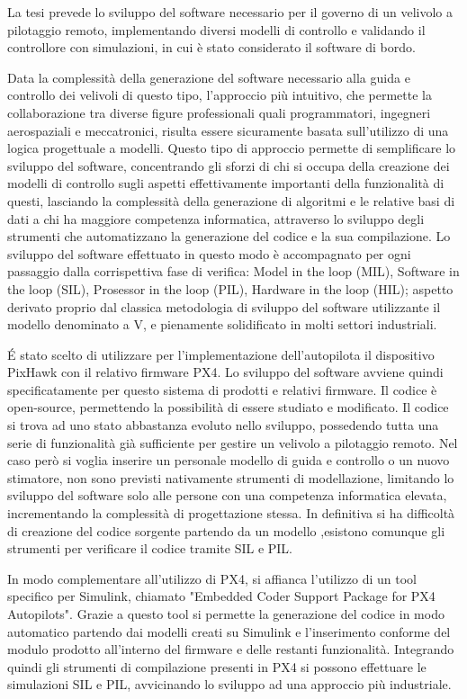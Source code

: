 \sommario
La tesi prevede lo sviluppo del software necessario per il governo di un velivolo a pilotaggio remoto, implementando diversi modelli di controllo e validando il controllore con simulazioni, in cui è stato considerato il software di bordo.

Data la complessità della generazione del software necessario alla guida e controllo dei velivoli di questo tipo, l'approccio più intuitivo, che permette la collaborazione tra diverse figure professionali quali programmatori, ingegneri aerospaziali e meccatronici, risulta essere sicuramente basata sull'utilizzo di una logica progettuale a modelli. Questo tipo di approccio permette di semplificare lo sviluppo del software, concentrando gli sforzi di chi si occupa della creazione dei modelli di controllo sugli aspetti effettivamente importanti della funzionalità di questi, lasciando la complessità della generazione di algoritmi e le relative basi di dati a chi ha maggiore competenza informatica, attraverso lo sviluppo degli strumenti che automatizzano la generazione del codice e la sua compilazione. 
Lo sviluppo del software effettuato in questo modo è accompagnato per ogni passaggio dalla corrispettiva fase di verifica: Model in the loop (MIL), Software in the loop (SIL), Prosessor in the loop (PIL), Hardware in the loop (HIL); aspetto derivato proprio dal classica metodologia di sviluppo del software utilizzante il modello denominato a V, e pienamente solidificato in molti settori industriali.

\'E stato scelto di utilizzare per l'implementazione dell'autopilota il dispositivo PixHawk con il relativo firmware PX4. Lo sviluppo del software avviene quindi specificatamente per questo sistema di prodotti e relativi firmware. Il codice è open-source, permettendo la possibilità di essere studiato e modificato. Il codice si trova ad uno stato abbastanza evoluto nello sviluppo, possedendo tutta una serie di funzionalità già sufficiente per gestire un velivolo a pilotaggio remoto. Nel caso però si voglia inserire un personale modello di guida e controllo o un nuovo stimatore, non sono previsti nativamente strumenti di modellazione, limitando lo sviluppo del software solo alle persone con una competenza informatica elevata, incrementando la complessità di progettazione stessa. In definitiva si ha difficoltà di creazione del codice sorgente partendo da un modello ,esistono comunque gli strumenti per verificare il codice tramite SIL e PIL.

In modo complementare all'utilizzo di PX4, si affianca l'utilizzo di un tool specifico per Simulink, chiamato "Embedded Coder Support Package
for PX4 Autopilots". Grazie a questo tool si permette la generazione del codice in modo automatico partendo dai modelli creati su Simulink e l'inserimento conforme del modulo prodotto all'interno del firmware e delle restanti funzionalità. Integrando quindi gli strumenti di compilazione presenti in PX4 si possono effettuare le simulazioni SIL e PIL, avvicinando lo sviluppo ad una approccio più industriale.

